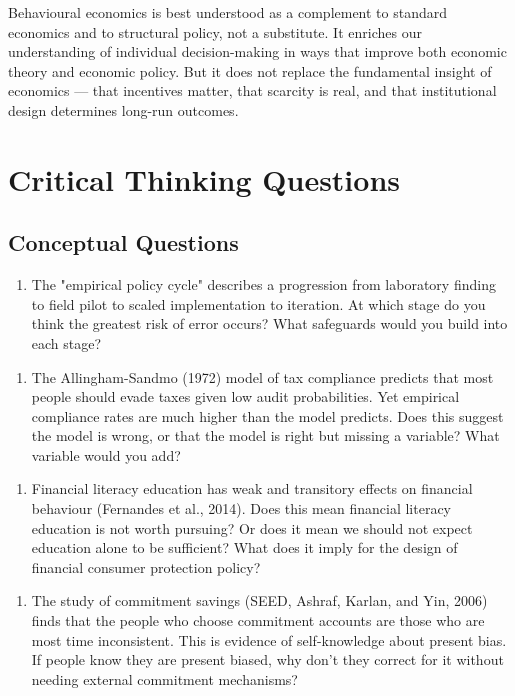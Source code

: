 \documentclass[12pt, letterpaper]{article}
\begin{document}
Behavioural economics is best understood as a complement to standard economics and to structural policy, not a substitute. It enriches our understanding of individual decision-making in ways that improve both economic theory and economic policy. But it does not replace the fundamental insight of economics --- that incentives matter, that scarcity is real, and that institutional design determines long-run outcomes.

\medskip


\section*{Critical Thinking Questions}



\subsection{Conceptual Questions}


\begin{enumerate}
\item The "empirical policy cycle" describes a progression from laboratory finding to field pilot to scaled implementation to iteration. At which stage do you think the greatest risk of error occurs? What safeguards would you build into each stage?
\end{enumerate}

\begin{enumerate}
\item The Allingham-Sandmo (1972) model of tax compliance predicts that most people should evade taxes given low audit probabilities. Yet empirical compliance rates are much higher than the model predicts. Does this suggest the model is wrong, or that the model is right but missing a variable? What variable would you add?
\end{enumerate}

\begin{enumerate}
\item Financial literacy education has weak and transitory effects on financial behaviour (Fernandes et al., 2014). Does this mean financial literacy education is not worth pursuing? Or does it mean we should not expect education alone to be sufficient? What does it imply for the design of financial consumer protection policy?
\end{enumerate}

\begin{enumerate}
\item The study of commitment savings (SEED, Ashraf, Karlan, and Yin, 2006) finds that the people who choose commitment accounts are those who are most time inconsistent. This is evidence of self-knowledge about present bias. If people know they are present biased, why don't they correct for it without needing external commitment mechanisms?
\end{enumerate}
\end{document}
